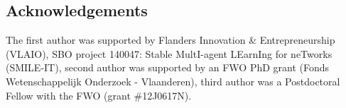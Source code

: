 \documentclass{article}
\begin{document}
\subsection*{Acknowledgements}
The first author was supported by Flanders Innovation \& Entrepreneurship  (VLAIO),  SBO  project  140047:   Stable  MultI-agent
LEarnIng for neTworks (SMILE-IT), second author was supported by an FWO PhD grant (Fonds Wetenschappelijk Onderzoek - Vlaanderen), third author was a Postdoctoral Fellow with the FWO (grant \#12J0617N). 





\end{document}
